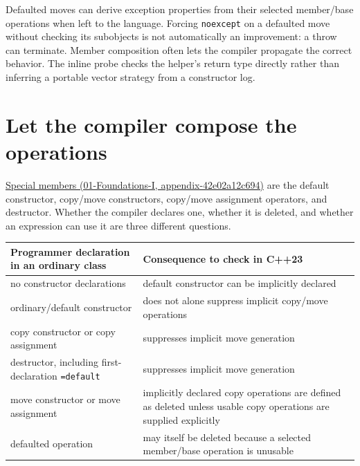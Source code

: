 Defaulted moves can derive exception properties from their selected member/base operations when left to the language. Forcing \texttt{noexcept} on a defaulted move without checking its subobjects is not automatically an improvement: a throw can terminate. Member composition often lets the compiler propagate the correct behavior. The inline probe checks the helper's return type directly rather than inferring a portable vector strategy from a constructor log.

\section{Let the compiler compose the operations}\label{05-engine-i-ch003-let-the-compiler-compose-the-operations}

\href{../01-Foundations-I/main.pdf\#nameddest=appendix-42e02a12c694}{Special members (01-Foundations-I, appendix-42e02a12c694)} are the default constructor, copy/move constructors, copy/move assignment operators, and destructor. Whether the compiler declares one, whether it is deleted, and whether an expression can use it are three different questions.

{\def\LTcaptype{none} %
\begin{longtable}[]{@{}
  >{\raggedright\arraybackslash}p{}
  >{\raggedright\arraybackslash}p{}@{}}
\toprule\noalign{}
\begin{minipage}[b]{\linewidth}\raggedright
Programmer declaration in an ordinary class
\end{minipage} & \begin{minipage}[b]{\linewidth}\raggedright
Consequence to check in C++23
\end{minipage} \\
\midrule\noalign{}
\endhead
\bottomrule\noalign{}
\endlastfoot
no constructor declarations & default constructor can be implicitly declared \\
ordinary/default constructor & does not alone suppress implicit copy/move operations \\
copy constructor or copy assignment & suppresses implicit move generation \\
destructor, including first-declaration \texttt{=default} & suppresses implicit move generation \\
move constructor or move assignment & implicitly declared copy operations are defined as deleted unless usable copy operations are supplied explicitly \\
defaulted operation & may itself be deleted because a selected member/base operation is unusable \\
\end{longtable}
}

